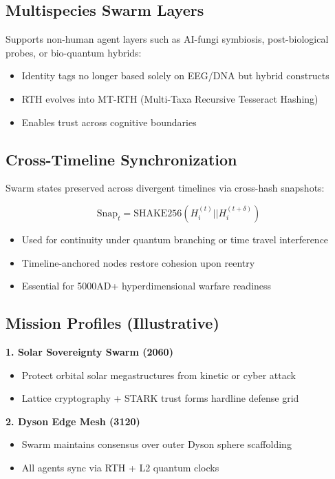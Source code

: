 \documentclass{article}
\begin{document}
\subsection*{Multispecies Swarm Layers}

Supports non-human agent layers such as AI-fungi symbiosis, post-biological probes, or bio-quantum hybrids:

\begin{itemize}
    \item Identity tags no longer based solely on EEG/DNA but hybrid constructs
    \item RTH evolves into MT-RTH (Multi-Taxa Recursive Tesseract Hashing)
    \item Enables trust across cognitive boundaries
\end{itemize}

\subsection*{Cross-Timeline Synchronization}

Swarm states preserved across divergent timelines via cross-hash snapshots:

\[
\text{Snap}_t = \text{SHAKE256}(H_i^{(t)} || H_i^{(t+\delta)})
\]

\begin{itemize}
    \item Used for continuity under quantum branching or time travel interference
    \item Timeline-anchored nodes restore cohesion upon reentry
    \item Essential for 5000AD+ hyperdimensional warfare readiness
\end{itemize}

\subsection*{Mission Profiles (Illustrative)}

\textbf{1. Solar Sovereignty Swarm (2060)}  
\begin{itemize}
    \item Protect orbital solar megastructures from kinetic or cyber attack
    \item Lattice cryptography + STARK trust forms hardline defense grid
\end{itemize}

\textbf{2. Dyson Edge Mesh (3120)}  
\begin{itemize}
    \item Swarm maintains consensus over outer Dyson sphere scaffolding
    \item All agents sync via RTH + L2 quantum clocks
\end{itemize}
\end{document}
